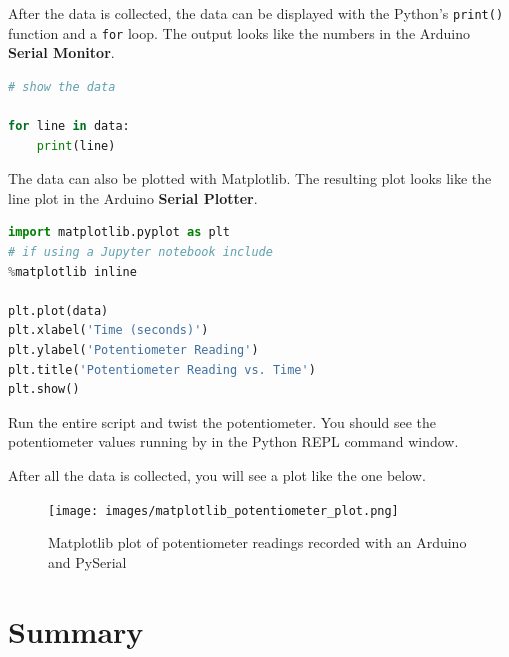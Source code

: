 \documentclass{book}
\begin{document}
    
        After the data is collected, the data can be displayed with the Python's
\lstinline!print()! function and a \lstinline!for! loop. The output
looks like the numbers in the Arduino \textbf{Serial Monitor}.
    




    
        \begin{lstlisting}[language=Python]
# show the data

for line in data:
    print(line)
\end{lstlisting}
    




    
        The data can also be plotted with Matplotlib. The resulting plot looks
like the line plot in the Arduino \textbf{Serial Plotter}.
    




    
        \begin{lstlisting}[language=Python]
import matplotlib.pyplot as plt
# if using a Jupyter notebook include
%matplotlib inline

plt.plot(data)
plt.xlabel('Time (seconds)')
plt.ylabel('Potentiometer Reading')
plt.title('Potentiometer Reading vs. Time')
plt.show()
\end{lstlisting}
    




    
        Run the entire script and twist the potentiometer. You should see the
potentiometer values running by in the Python REPL command window.

After all the data is collected, you will see a plot like the one below.

\begin{figure}
\centering
\texttt{[image: images/matplotlib\_potentiometer\_plot.png]}
\caption{Matplotlib plot of potentiometer readings recorded with an
Arduino and PySerial}
\end{figure}
    




    
        \newpage
        \section{Summary}\label{summary}

    
\end{document}

